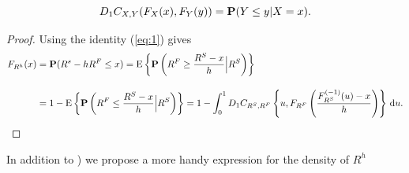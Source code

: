 \begin{equation}
  \label{eq:1}
  D_1 C_{X,Y}(F_X(x), F_Y(y)) = {\bf P}(Y\leq y|X=x).
\end{equation}
\begin{proof}
  Using the identity (\ref{eq:1}) gives
  \begin{align*}
    F_{R^h}(x) &= \p(R^s - h R^F\leq x) %
                 = \operatorname{E}\left\{\p\left(R^F\geq \frac{R^S-x}{h}\Big|
                 R^S\right)\right\}\\[10pt]
               &= 1-\operatorname{E}\left\{\p\left(R^F\leq \frac{R^S-x}{h}\Big|
                 R^S\right)\right\}%
               = 1- \int_0^1 D_1 C_{R^S, R^F}\left\{u,
                 F_{R^F}\left(\frac{F^{(-1)}_{R^S}(u) -
                 x}{h}\right)\right\}\, \dd u.
  \end{align*}
\end{proof}\medskip

In addition to \cite{barbi2014copula}) we propose a more handy expression for the density of $R^h$

